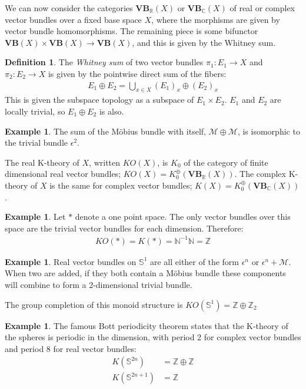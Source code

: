 \documentclass[10pt,a4paper]{article}
\theoremstyle{definition}
\newtheorem{example}[theorem]{Example}
\newtheorem{definition}[theorem]{Definition}
\begin{document}
We can now consider the categories $\mathbf{VB}_\mathbb{R}(X)$ or $\mathbf{VB}_\mathbb{C}(X)$ of real or complex vector bundles over a fixed base space $X$, where the morphisms are given by vector bundle homomorphisms. The remaining piece is some bifunctor $\mathbf{VB}(X) \times \mathbf{VB}(X) \to \mathbf{VB}(X)$, and this is given by the Whitney sum.

\begin{definition}
The \emph{Whitney sum} of two vector bundles $\pi_1 : E_1 \to X$ and $\pi_2 : E_2 \to X$ is given by the pointwise direct sum of the fibers:
\begin{align*}
E_1 \oplus E_2 = \bigcup_{x \in X} (E_1)_x \oplus (E_2)_x
\end{align*}
This is given the subspace topology as a subspace of $E_1 \times E_2$. $E_1$ and $E_2$ are locally trivial, so $E_1 \oplus E_2$ is also.
\end{definition}

\begin{example}
The sum of the M\"{o}bius bundle with itself, $\mathcal{M} \oplus \mathcal{M}$, is isomorphic to the trivial bundle $\epsilon^2$.
\end{example}

The real K-theory of $X$, written $KO(X)$, is $K_0$ of the category of finite dimensional real vector bundles; $KO(X) = K_0^\oplus(\mathbf{VB}_\mathbb{R}(X))$. The complex K-theory of $X$ is the same for complex vector bundles; $K(X) = K_0^\oplus(\mathbf{VB}_\mathbb{C}(X))$.

\begin{example}
Let $*$ denote a one point space. The only vector bundles over this space are the trivial vector bundles for each dimension. Therefore:
\begin{align*}
KO(*) = K(*) = \mathbb{N}^{-1}\mathbb{N} = \mathbb{Z}
\end{align*}
\end{example}

\begin{example}
Real vector bundles on $\mathbb{S}^1$ are all either of the form $\epsilon^n$ or $\epsilon^n + \mathcal{M}$. When two are added, if they both contain a M\"{o}bius bundle these components will combine to form a 2-dimensional trivial bundle.

The group completion of this monoid structure is $KO(\mathbb{S}^1) = \mathbb{Z} \oplus \mathbb{Z}_2$
\end{example}

\begin{example}
The famous Bott periodicity theorem states that the K-theory of the spheres is periodic in the dimension, with period 2 for complex vector bundles and period 8 for real vector bundles:
\begin{align*}
K(\mathbb{S}^{2n}) &= \mathbb{Z} \oplus \mathbb{Z} \\
K(\mathbb{S}^{2n+1}) &= \mathbb{Z}
\end{align*}
\end{example}
\end{document}
